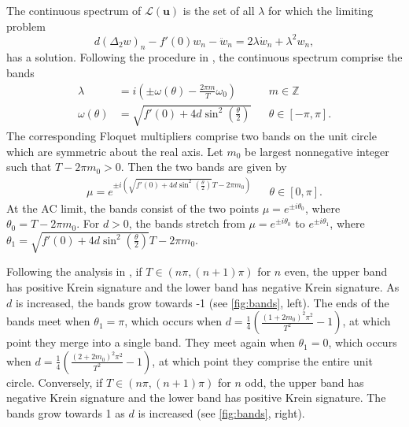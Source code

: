 \documentclass[12pt,reqno]{amsart}
\def\Z{{\mathbb Z}}
\def\calL{\mathcal{L}}
\newcommand{\uvec}{\mathbf{u}}
\begin{document}
The continuous spectrum of $\calL(\uvec)$ is the set of all $\lambda$ for which the limiting problem 
\begin{equation}\label{eq:DKGeigcont}
d (\Delta_2 w)_n - f'(0)w_n - \ddot{w}_n = 2 \lambda \dot{w}_n + \lambda^2 w_n,
\end{equation}
has a solution. Following the procedure in \cite[Section 2.1]{cuevas-maraver2016}, the continuous spectrum comprise the bands
\begin{equation}
\begin{aligned}
\lambda &= i\left( \pm \omega(\theta) - \frac{2 \pi m}{T} \omega_0 \right) && m \in \Z \\
\omega(\theta) &= \sqrt{ f'(0) + 4 d \sin^2\left( \frac{\theta}{2} \right) } && \theta \in [-\pi, \pi].
\end{aligned}
\end{equation}
The corresponding Floquet multipliers comprise two bands on the unit circle which are symmetric about the real axis. Let $m_0$ be largest nonnegative integer such that $T - 2 \pi m_0 > 0$. Then the two bands are given by
\begin{equation}
\begin{aligned}
\mu = e^{\pm i \left( \sqrt{f'(0) + 4 d \sin^2 \left(\frac{\theta}{2}\right) }T - 2 \pi m_0 \right) } && \theta \in [0, \pi].
\end{aligned}
\end{equation}
At the AC limit, the bands consist of the two points $\mu = e^{\pm i \theta_0}$, where $\theta_0 =  T - 2 \pi m_0$. For $d>0$, the bands stretch from $\mu = e^{\pm i \theta_0}$ to $e^{\pm i \theta_1}$, where $\theta_1 = \sqrt{f'(0) + 4 d \sin^2 \left(\frac{\theta}{2}\right) }T - 2 \pi m_0$. 

Following the analysis in \cite[Section 2.2]{cuevas-maraver2016}, if $T \in (n \pi, (n+1)\pi)$ for $n$ even, the upper band has positive Krein signature and the lower band has negative Krein signature. As $d$ is increased, the bands grow towards -1 (see \cref{fig:bands}, left). The ends of the bands meet when $\theta_1 = \pi$, which occurs when $d = \frac{1}{4} \left( \frac{(1 + 2 m_0)^2 \pi^2}{T^2} - 1\right)$, at which point they merge into a single band. They meet again when $\theta_1 = 0$, which occurs when $d = \frac{1}{4} \left( \frac{(2 + 2 m_0)^2 \pi^2}{T^2} - 1\right)$, at which point they comprise the entire unit circle.
Conversely, if $T \in (n \pi, (n+1)\pi)$ for $n$ odd, the upper band has negative Krein signature and the lower band has positive Krein signature. The bands grow towards 1 as $d$ is increased (see \cref{fig:bands}, right).
\end{document}
